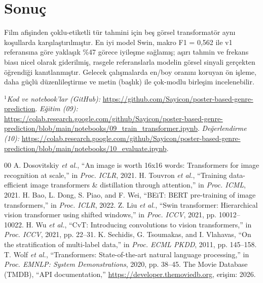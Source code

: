 \documentclass[conference]{IEEEtran}
\begin{document}
\section{Sonuç}
Film afişinden çoklu-etiketli tür tahmini için beş görsel transformatör aynı
koşullarda karşılaştırılmıştır. En iyi model Swin, makro F1 = 0,562 ile v1
referansına göre yaklaşık \%47 görece iyileşme sağlamış; aşırı tahmin ve frekans
biası nicel olarak giderilmiş, rasgele referanslarla modelin görsel sinyali
gerçekten öğrendiği kanıtlanmıştır. Gelecek çalışmalarda en/boy oranını koruyan
ön işleme, daha güçlü düzenlileştirme ve metin (başlık) ile çok-modlu birleşim
incelenebilir.

\vspace{4pt}
\noindent\footnotesize{%
$^{1}$\textit{Kod ve notebook'lar (GitHub):}
\url{https://github.com/Sayicon/poster-based-genre-prediction}.
\textit{Eğitim (09):}
\url{https://colab.research.google.com/github/Sayicon/poster-based-genre-prediction/blob/main/notebooks/09_train_transformer.ipynb}.
\textit{Değerlendirme (10):}
\url{https://colab.research.google.com/github/Sayicon/poster-based-genre-prediction/blob/main/notebooks/10_evaluate.ipynb}.%
}

\begin{thebibliography}{00}
 A. Dosovitskiy \textit{et al.}, ``An image is worth 16x16 words: Transformers for image recognition at scale,'' in \textit{Proc. ICLR}, 2021.
 H. Touvron \textit{et al.}, ``Training data-efficient image transformers \& distillation through attention,'' in \textit{Proc. ICML}, 2021.
 H. Bao, L. Dong, S. Piao, and F. Wei, ``BEiT: BERT pre-training of image transformers,'' in \textit{Proc. ICLR}, 2022.
 Z. Liu \textit{et al.}, ``Swin transformer: Hierarchical vision transformer using shifted windows,'' in \textit{Proc. ICCV}, 2021, pp. 10012--10022.
 H. Wu \textit{et al.}, ``CvT: Introducing convolutions to vision transformers,'' in \textit{Proc. ICCV}, 2021, pp. 22--31.
 K. Sechidis, G. Tsoumakas, and I. Vlahavas, ``On the stratification of multi-label data,'' in \textit{Proc. ECML PKDD}, 2011, pp. 145--158.
 T. Wolf \textit{et al.}, ``Transformers: State-of-the-art natural language processing,'' in \textit{Proc. EMNLP: System Demonstrations}, 2020, pp. 38--45.
 The Movie Database (TMDB), ``API documentation,'' \url{https://developer.themoviedb.org}, erişim: 2026.
\end{thebibliography}
\end{document}
